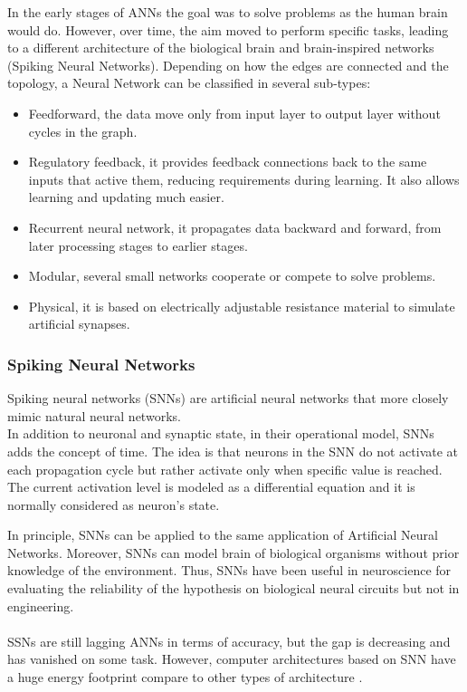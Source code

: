 In the early stages of ANNs the goal was to solve problems as the human brain would do. However, over time, the aim moved to perform specific tasks, leading to a different architecture of the biological brain and brain-inspired networks (Spiking Neural Networks).
\newpage
Depending on how the edges are connected and the topology, a Neural Network can be classified in several sub-types:
\begin{itemize}
\item Feedforward, the data move only from input layer to output layer without cycles in the graph.
\item Regulatory feedback, it provides feedback connections back to the same inputs that active them, reducing requirements during learning. It also allows learning and updating much easier.
\item Recurrent neural network, it propagates data backward and forward, from later processing stages to earlier stages.
\item Modular, several small networks cooperate or compete to solve problems.
\item Physical, it is based on electrically adjustable resistance material to simulate artificial synapses.
\end{itemize}

\subsubsection{Spiking Neural Networks}
Spiking neural networks (SNNs) are artificial neural networks that more closely mimic natural neural networks\cite{article:1}. \\In addition to neuronal and synaptic state, in their operational model, SNNs adds the concept of time. The idea is that neurons in the SNN do not activate at each propagation cycle but rather activate only when specific value is reached.\\
The current activation level is modeled as a differential equation and it is normally considered as neuron's state.

In principle, SNNs can be applied to the same application of Artificial Neural Networks. Moreover, SNNs can model brain of biological organisms without prior knowledge of the environment. Thus, SNNs have been useful in neuroscience for evaluating the reliability of the hypothesis on biological neural circuits but not in engineering.\\\\
SSNs are still lagging ANNs in terms of accuracy, but the gap is decreasing and has vanished on some task\cite{article:2}. However, computer architectures based on SNN have a huge energy footprint compare to other types of architecture \cite{paper:44}.
\newpage
